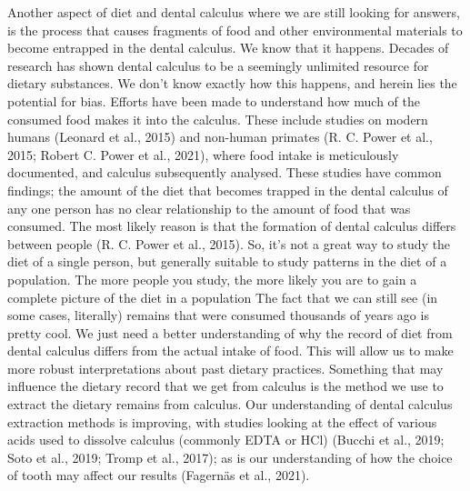 \documentclass[
  letterpaper,
]{book}
\begin{document}
Another aspect of diet and dental calculus where we are still looking
for answers, is the process that causes fragments of food and other
environmental materials to become entrapped in the dental calculus. We
know that it happens. Decades of research has shown dental calculus to
be a seemingly unlimited resource for dietary substances. We don't know
exactly how this happens, and herein lies the potential for bias.
Efforts have been made to understand how much of the consumed food makes
it into the calculus. These include studies on modern humans (Leonard et
al., 2015) and non-human primates (R. C. Power et al., 2015; Robert C.
Power et al., 2021), where food intake is meticulously documented, and
calculus subsequently analysed. These studies have common findings; the
amount of the diet that becomes trapped in the dental calculus of any
one person has no clear relationship to the amount of food that was
consumed. The most likely reason is that the formation of dental
calculus differs between people (R. C. Power et al., 2015). So, it's not
a great way to study the diet of a single person, but generally suitable
to study patterns in the diet of a population. The more people you
study, the more likely you are to gain a complete picture of the diet in
a population The fact that we can still see (in some cases, literally)
remains that were consumed thousands of years ago is pretty cool. We
just need a better understanding of why the record of diet from dental
calculus differs from the actual intake of food. This will allow us to
make more robust interpretations about past dietary practices. Something
that may influence the dietary record that we get from calculus is the
method we use to extract the dietary remains from calculus. Our
understanding of dental calculus extraction methods is improving, with
studies looking at the effect of various acids used to dissolve calculus
(commonly EDTA or HCl) (Bucchi et al., 2019; Soto et al., 2019; Tromp et
al., 2017); as is our understanding of how the choice of tooth may
affect our results (Fagernäs et al., 2021).
\end{document}
